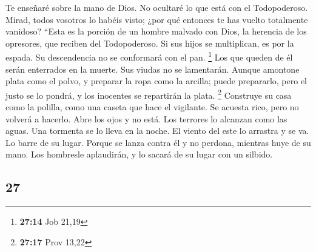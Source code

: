 \begin{paracol}{2}
 Te enseñaré sobre la mano de Dios. No ocultaré lo que
está con el Todopoderoso.  Mirad, todos vosotros lo
habéis visto; ¿por qué entonces te has vuelto totalmente vanidoso?
 ``Esta es la porción de un hombre malvado con Dios, la
herencia de los opresores, que reciben del Todopoderoso. 
Si sus hijos se multiplican, es por la espada. Su descendencia no se
conformará con el pan. \footnote{\textbf{27:14} Job 21,19}
 Los que queden de él serán enterrados en la muerte. Sus
viudas no se lamentarán.  Aunque amontone plata como el
polvo, y preparar la ropa como la arcilla;  puede
prepararlo, pero el justo se lo pondrá, y los inocentes se repartirán la
plata. \footnote{\textbf{27:17} Prov 13,22}  Construye su
casa como la polilla, como una caseta que hace el vigilante.
 Se acuesta rico, pero no volverá a hacerlo. Abre los
ojos y no está.  Los terrores lo alcanzan como las aguas.
Una tormenta se lo lleva en la noche.  El viento del este
lo arrastra y se va. Lo barre de su lugar.  Porque se
lanza contra él y no perdona, mientras huye de su mano. 
Los hombresle aplaudirán, y lo sacará de su lugar con un silbido.

\switchcolumn
\begin{otherlanguage}{english}

\hypertarget{section-53}{%
\section{27}\label{section-53}}


\end{otherlanguage}
\end{paracol}
